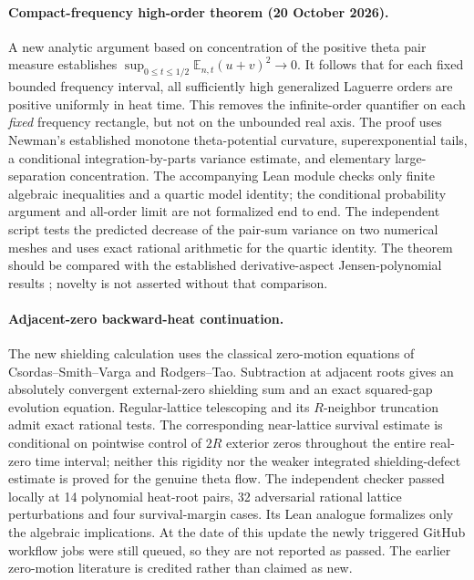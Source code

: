 \paragraph{Compact-frequency high-order theorem (20 October 2026).}
A new analytic argument based on concentration of
the positive theta pair measure establishes
$\sup_{0\le t\le1/2}\mathbb E_{n,t}(u+v)^2\to0$.
It follows that for each fixed bounded frequency
interval, all sufficiently high generalized
Laguerre orders are positive uniformly in heat time.
This removes the infinite-order quantifier on
each \emph{fixed} frequency rectangle,
but not on the unbounded real axis.
The proof uses Newman's established monotone
theta-potential curvature, superexponential
tails, a conditional integration-by-parts
variance estimate, and elementary
large-separation concentration.
The accompanying Lean module
checks only finite algebraic inequalities and
a quartic model identity; the conditional
probability argument and all-order limit
are not formalized end to end.
The independent script
tests the predicted decrease of the
pair-sum variance on two numerical meshes
and uses exact rational arithmetic for
the quartic identity.
The theorem should be compared with
the established derivative-aspect
Jensen-polynomial results
\cite{GORZ,JensenXi}; novelty is not
asserted without that comparison.
\paragraph{Adjacent-zero backward-heat continuation.}
The new shielding calculation uses the classical
zero-motion equations of Csordas--Smith--Varga
and Rodgers--Tao. Subtraction at adjacent
roots gives an absolutely convergent
external-zero shielding sum and an exact
squared-gap evolution equation.
Regular-lattice telescoping and its
$R$-neighbor truncation admit exact rational
tests. The corresponding near-lattice
survival estimate is conditional on
pointwise control of $2R$ exterior zeros
throughout the entire real-zero time interval;
neither this rigidity nor the weaker
integrated shielding-defect estimate is
proved for the genuine theta flow.
The independent checker
passed locally at 14 polynomial heat-root
pairs, 32 adversarial rational lattice
perturbations and four survival-margin cases.
Its Lean analogue
formalizes only the algebraic implications.
At the date of this update the newly
triggered GitHub workflow jobs were still
queued, so they are not reported as passed.
The earlier zero-motion literature is
credited rather than claimed as new.

